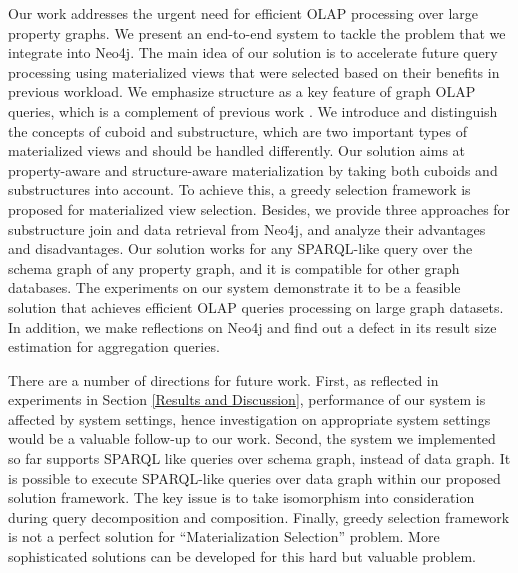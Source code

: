 Our work addresses the urgent need for efficient OLAP processing over large property graphs.  We present an end-to-end system to tackle the problem that we integrate into Neo4j. The main idea of our solution is to accelerate future query processing using materialized views that were selected based on their benefits in previous workload. We emphasize structure as a key feature of graph OLAP queries, which is a complement of previous work \cite{DBLP:conf/sigmod/ZhaoLXH11}. We introduce and distinguish the concepts of cuboid and substructure, which are two important types of materialized views and should be handled differently. Our solution aims at property-aware and structure-aware materialization by taking both cuboids and substructures into account. To achieve this, a greedy selection framework is proposed for materialized view selection. Besides, we provide three approaches for substructure join and data retrieval from Neo4j, and analyze their advantages and disadvantages. Our solution works for any SPARQL-like query over the schema graph of any property graph, and it is compatible for other graph databases. The experiments on our system demonstrate it to be a feasible solution that achieves efficient OLAP queries processing on large graph datasets.  In addition, we make reflections on Neo4j and find out a defect in its result size estimation for aggregation queries.    

There are a number of directions for future work. First, as reflected in experiments in Section \ref{Results and Discussion}, performance of our system is affected by system settings, hence investigation on appropriate system settings would be a valuable follow-up to our work. Second, the system we implemented so far supports SPARQL like queries over schema graph, instead of data graph. It is possible to execute SPARQL-like queries over data graph within our proposed solution framework. The key issue is to take isomorphism into consideration during query decomposition and composition. Finally, greedy selection framework is not a perfect solution for ``Materialization Selection'' problem. More sophisticated solutions can be developed for this hard but valuable problem.


